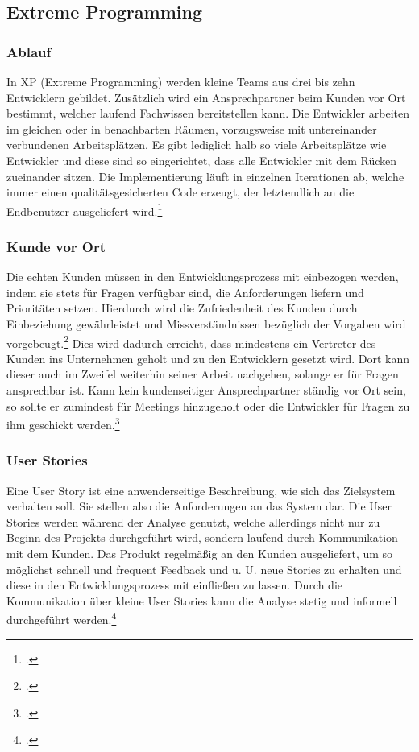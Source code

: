 \subsection{Extreme Programming}
\subsubsection{Ablauf}
In XP (Extreme Programming) werden kleine Teams aus drei bis zehn Entwicklern gebildet. Zusätzlich wird ein Ansprechpartner beim Kunden vor Ort bestimmt, welcher laufend Fachwissen bereitstellen kann. Die Entwickler arbeiten im gleichen oder in benachbarten Räumen, vorzugsweise mit untereinander verbundenen Arbeitsplätzen. Es gibt lediglich halb so viele Arbeitsplätze wie Entwickler und diese sind so eingerichtet, dass alle Entwickler mit dem Rücken zueinander sitzen. Die Implementierung läuft in einzelnen Iterationen ab, welche immer einen qualitätsgesicherten Code erzeugt, der letztendlich an die Endbenutzer ausgeliefert wird.\footcite[Vgl.][Seite 165]{cockburn}

\subsubsection{Kunde vor Ort}
Die echten Kunden müssen in den Entwicklungsprozess mit einbezogen werden, indem sie stets für Fragen verfügbar sind, die Anforderungen liefern und Prioritäten setzen. Hierdurch wird die Zufriedenheit des Kunden durch Einbeziehung gewährleistet und Missverständnissen bezüglich der Vorgaben wird vorgebeugt.\footcite[Vgl.][]{internet1} Dies wird dadurch erreicht, dass mindestens ein Vertreter des Kunden ins Unternehmen geholt und zu den Entwicklern gesetzt wird. Dort kann dieser auch im Zweifel weiterhin seiner Arbeit nachgehen, solange er für Fragen ansprechbar ist. Kann kein kundenseitiger Ansprechpartner ständig vor Ort sein, so sollte er zumindest für Meetings hinzugeholt oder die Entwickler für Fragen zu ihm geschickt werden.\footcite[Vgl.][Seite 18 ff.]{extreme}

\subsubsection{User Stories}
Eine User Story ist eine anwenderseitige Beschreibung, wie sich das Zielsystem verhalten soll. Sie stellen also die Anforderungen an das System dar. Die User Stories werden während der Analyse genutzt, welche allerdings nicht nur zu Beginn des Projekts durchgeführt wird, sondern laufend durch Kommunikation mit dem Kunden. Das Produkt regelmäßig an den Kunden ausgeliefert, um so möglichst schnell und frequent Feedback und u. U. neue Stories zu erhalten und diese in den Entwicklungsprozess mit einfließen zu lassen. Durch die Kommunikation über kleine User Stories kann die Analyse stetig und informell durchgeführt werden.\footcite[Vgl.][Seite 24]{extreme}

